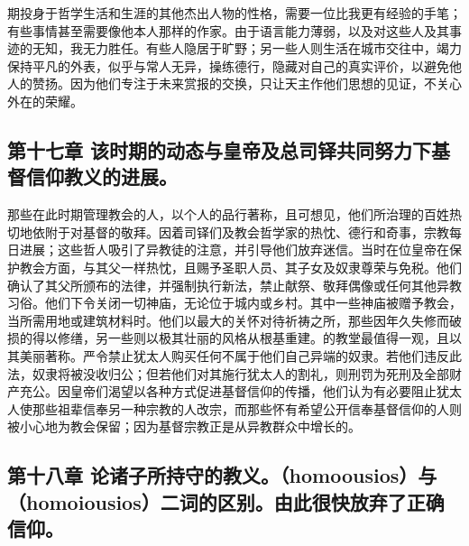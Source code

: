 期投身于哲学生活和生涯的其他杰出人物的性格，需要一位比我更有经验的手笔；有些事情甚至需要像他本人那样的作家。由于语言能力薄弱，以及对这些人及其事迹的无知，我无力胜任。有些人隐居于旷野；另一些人则生活在城市交往中，竭力保持平凡的外表，似乎与常人无异，操练德行，隐藏对自己的真实评价，以避免他人的赞扬。因为他们专注于未来赏报的交换，只让天主作他们思想的见证，不关心外在的荣耀。\par


\subsection{第十七章 该时期的动态与皇帝及总司铎共同努力下基督信仰教义的进展。}

那些在此时期管理教会的人，以个人的品行著称，且可想见，他们所治理的百姓热切地依附于对基督的敬拜。因着司铎们及教会哲学家的热忱、德行和奇事，宗教每日进展；这些哲人吸引了异教徒的注意，并引导他们放弃迷信。当时在位皇帝在保护教会方面，与其父一样热忱，且赐予圣职人员、其子女及奴隶尊荣与免税。他们确认了其父所颁布的法律，并强制执行新法，禁止献祭、敬拜偶像或任何其他异教习俗。他们下令关闭一切神庙，无论位于城内或乡村。其中一些神庙被赠予教会，当所需用地或建筑材料时。他们以最大的关怀对待祈祷之所，那些因年久失修而破损的得以修缮，另一些则以极其壮丽的风格从根基重建。的教堂最值得一观，且以其美丽著称。严令禁止犹太人购买任何不属于他们自己异端的奴隶。若他们违反此法，奴隶将被没收归公；但若他们对其施行犹太人的割礼，则刑罚为死刑及全部财产充公。因皇帝们渴望以各种方式促进基督信仰的传播，他们认为有必要阻止犹太人使那些祖辈信奉另一种宗教的人改宗，而那些怀有希望公开信奉基督信仰的人则被小心地为教会保留；因为基督宗教正是从异教群众中增长的。\par


\subsection{第十八章 论诸子所持守的教义。（homoousios）与（homoiousios）二词的区别。由此很快放弃了正确信仰。}

